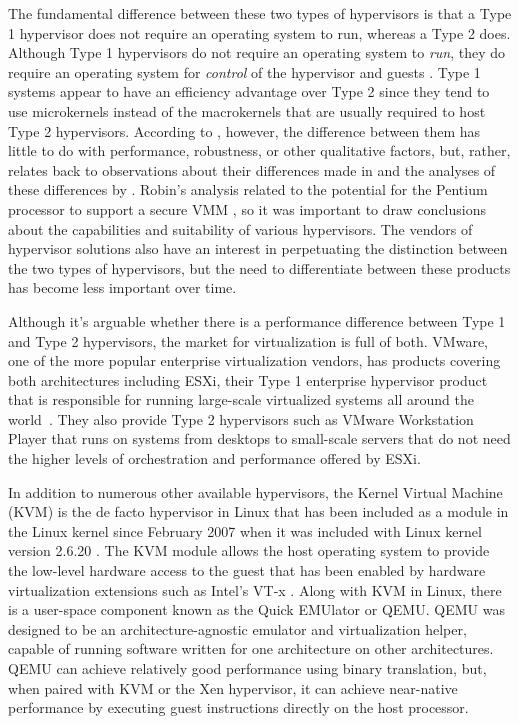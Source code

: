 The fundamental difference between these two types of hypervisors is that a Type 1 hypervisor does not require an operating system to run, whereas a Type 2 does.
Although Type 1 hypervisors do not require an operating system to \emph{run}, they do require an operating system for \emph{control} of the hypervisor and guests \autocite{_liguori_1}.
Type 1 systems appear to have an efficiency advantage over Type 2 since they tend to use microkernels instead of the macrokernels that are usually required to host Type 2 hypervisors.
According to \autocite{_liguori_1}, however, the difference between them has little to do with performance, robustness, or other qualitative factors, but, rather, relates back to  observations about their differences made in \autocite{_popek_1} and the analyses of these differences by \autocite{_robin_1}.
Robin's analysis related to the potential for the Pentium processor to support a secure VMM \autocite{_robin_1}, so it was important to draw conclusions about the capabilities and suitability of various hypervisors.
The vendors of hypervisor solutions also have an interest in perpetuating the distinction between the two types of hypervisors, but the need to differentiate between these products has become less important over time.  

Although it's arguable whether there is a performance difference between Type 1 and Type 2 hypervisors, the market for virtualization is full of both.
VMware, one of the more popular enterprise virtualization vendors, has products covering both architectures including ESXi, their Type 1 enterprise hypervisor product that is responsible for running large-scale virtualized systems all around the world~\autocite{vmwareProducts}.
They also provide Type 2 hypervisors such as VMware Workstation Player that runs on systems from desktops to small-scale servers that do not need the higher levels of orchestration and performance offered by ESXi.

In addition to numerous other available hypervisors, the Kernel Virtual Machine (KVM) is the de facto hypervisor in Linux that has been included as a module in the Linux kernel since February 2007 when it was included with Linux kernel version 2.6.20 \autocite{_kvm_1}.
The KVM module allows the host operating system to provide the low-level hardware access to the guest that has been enabled by hardware virtualization extensions such as Intel's VT-x \autocite{_grinberg_1}.
Along with KVM in Linux, there is a user-space component known as the Quick EMUlator or QEMU\autocite{_qemu_1}.
QEMU was designed to be an architecture-agnostic emulator and virtualization helper, capable of running software written for one architecture on other architectures.
QEMU can achieve relatively good performance using binary translation, but, when paired with KVM or the Xen hypervisor, it can achieve near-native performance by executing guest instructions directly on the host processor.

